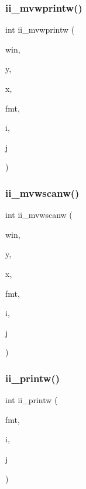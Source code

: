 \mbox{\label{C-macros_8c_aba1dee7f00e339e2bcd867896705bbf0}} 
\subsubsection{\texorpdfstring{ii\+\_\+mvwprintw()}{ii\_mvwprintw()}}
{\footnotesize\ttfamily int ii\+\_\+mvwprintw (\begin{DoxyParamCaption}\item[{W\+I\+N\+D\+OW $\ast$}]{win,  }\item[{int}]{y,  }\item[{int}]{x,  }\item[{const char $\ast$}]{fmt,  }\item[{int}]{i,  }\item[{int}]{j }\end{DoxyParamCaption})}

\mbox{\label{C-macros_8c_a5116eef3b9a53d8f12436984bfec0717}} 
\subsubsection{\texorpdfstring{ii\+\_\+mvwscanw()}{ii\_mvwscanw()}}
{\footnotesize\ttfamily int ii\+\_\+mvwscanw (\begin{DoxyParamCaption}\item[{W\+I\+N\+D\+OW $\ast$}]{win,  }\item[{int}]{y,  }\item[{int}]{x,  }\item[{char $\ast$}]{fmt,  }\item[{int $\ast$}]{i,  }\item[{int $\ast$}]{j }\end{DoxyParamCaption})}

\mbox{\label{C-macros_8c_a485ef33f3e0fb3900f69d4b869b619f1}} 
\subsubsection{\texorpdfstring{ii\+\_\+printw()}{ii\_printw()}}
{\footnotesize\ttfamily int ii\+\_\+printw (\begin{DoxyParamCaption}\item[{const char $\ast$}]{fmt,  }\item[{int}]{i,  }\item[{int}]{j }\end{DoxyParamCaption})}


